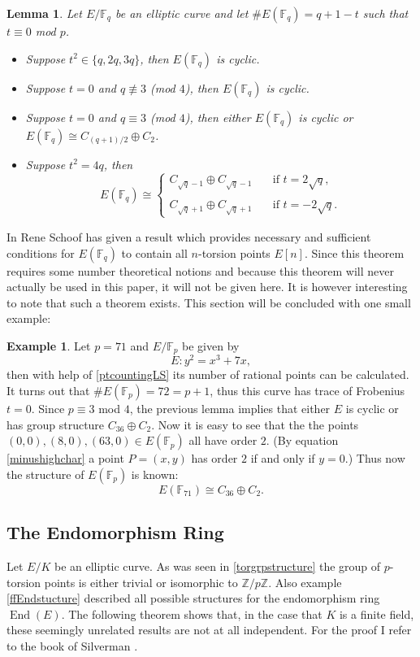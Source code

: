\documentclass{article}
\numberwithin{equation}{section}
\newtheorem{lemma}[theorem]{Lemma}
\theoremstyle{definition}
\newtheorem{example}[theorem]{Example}
\newcommand{\ZZ}{{\mathbb Z}} %
\newcommand{\Zmod}[1]{\ZZ / #1\ZZ} %
\newcommand{\FF}[1]{{\mathbb F}_{#1}} %
\newcommand{\Endring}[1]{\operatorname{End} (#1)} %
\begin{document}
\begin{lemma}\label{sscurvestructure}
Let $E/\FF{q}$ be an elliptic curve and let $\#E(\FF{q})=q+1-t$ such that $t \equiv 0$ mod $p$. 
\begin{itemize}
\item Suppose $t^2 \in \{q,2q,3q\}$, then $E(\FF{q})$ is cyclic.
\item Suppose $t=0$ and $q \not\equiv 3$ (mod $4$), then $E(\FF{q})$ is cyclic. 
\item Suppose $t=0$ and $q \equiv 3$ (mod $4$), then either $E(\FF{q})$ is cyclic or $E(\FF{q}) \cong C_{(q+1)/2} \oplus C_2$. 
\item Suppose $t^2 = 4q$, then $$E(\FF{q}) \cong \left \{ \begin{array}{ll} C_{\sqrt{q}-1} \oplus C_{\sqrt{q}-1} \quad &\text{if } t= 2\sqrt{q}, \\ \\ C_{\sqrt{q}+1} \oplus C_{\sqrt{q}+1} &\text{if } t=-2\sqrt{q}.  \end{array}$$
\end{itemize}
\end{lemma}

In \cite[3.7]{R.Schoof} Rene Schoof has given a result which provides necessary and sufficient conditions for $E(\FF{q})$ to contain all $n$-torsion points $E[n]$. Since this theorem requires some number theoretical notions and because this theorem will never actually be used in this paper, it will not be given here. It is however interesting to note that such a theorem exists. This section will be concluded with one small example:

\begin{example}
Let $p=71$ and $E/\FF{p}$ be given by $$E:y^2=x^3+7x,$$ then with help of \ref{ptcountingLS} its number of rational points can be calculated. It turns out that $\#E(\FF{p})=72=p+1$, thus this curve has trace of Frobenius $t=0$. Since $p \equiv 3$ mod $4$, the previous lemma implies that either $E$ is cyclic or has group structure $C_{36} \oplus C_2$. Now it is easy to see that the the points $(0,0),(8,0),(63,0) \in E(\FF{p})$ all have order $2$. (By equation \ref{minushighchar} a point $P=(x,y)$ has order $2$ if and only if $y=0$.) Thus now the structure of $E(\FF{p})$ is known: $$E(\FF{71}) \cong C_{36} \oplus C_2.$$ 
\end{example}




\subsection{The Endomorphism Ring}
Let $E/K$ be an elliptic curve. As was seen in \ref{torgrpstructure} the group of $p$-torsion points is either trivial or isomorphic to $\Zmod{p}$. Also example \ref{ffEndstucture} described all possible structures for the endomorphism ring $\Endring{E}$. The following theorem shows that, in the case that $K$ is a finite field, these seemingly unrelated results are not at all independent. For the proof I refer to the book of Silverman \cite[V.3.1]{Silverman}.
\end{document}
